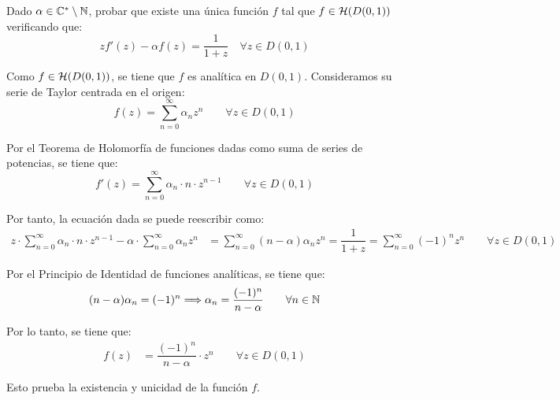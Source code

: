 \begin{ejercicio}
    Dado $\alpha \in \mathbb{C}^*\setminus \mathbb{N}$, probar que existe una única función $f$ tal que $f \in \mathcal{H}(D(0,1))$ verificando que:
    \begin{equation*}
        z f'(z) - \alpha f(z) = \frac{1}{1+z} \quad \forall z \in D(0,1)
    \end{equation*}

    Como $f\in \mathcal{H}(D(0,1))$, se tiene que $f$ es analítica en $D(0,1)$. Consideramos su serie de Taylor centrada en el origen:
    \begin{equation*}
        f(z) = \sum_{n=0}^{\infty} \alpha_n z^n \qquad \forall z \in D(0,1)
    \end{equation*}

    Por el Teorema de Holomorfía de funciones dadas como suma de series de potencias, se tiene que:
    \begin{equation*}
        f'(z) = \sum_{n=0}^{\infty} \alpha_n\cdot n\cdot z^{n-1} \qquad \forall z \in D(0,1)
    \end{equation*}

    Por tanto, la ecuación dada se puede reescribir como:
    \begin{align*}
        z\cdot \sum_{n=0}^{\infty} \alpha_n\cdot n\cdot z^{n-1} - \alpha\cdot \sum_{n=0}^{\infty} \alpha_n z^n &= \sum_{n=0}^{\infty} (n-\alpha)\alpha_n z^n
        = \dfrac{1}{1+z}=\sum_{n=0}^{\infty} (-1)^n z^n \qquad \forall z \in D(0,1)
    \end{align*}

    Por el Principio de Identidad de funciones analíticas, se tiene que:
    \begin{equation*}
        (n-\alpha)\alpha_n = (-1)^n\Longrightarrow
        \alpha_n = \frac{(-1)^n}{n-\alpha} \qquad \forall n \in \mathbb{N}
    \end{equation*}

    Por lo tanto, se tiene que:
    \begin{align*}
        f(z) &= \dfrac{(-1)^n}{n-\alpha}\cdot z^n\qquad \forall z \in D(0,1)
    \end{align*}

    Esto prueba la existencia y unicidad de la función $f$.    
\end{ejercicio}

